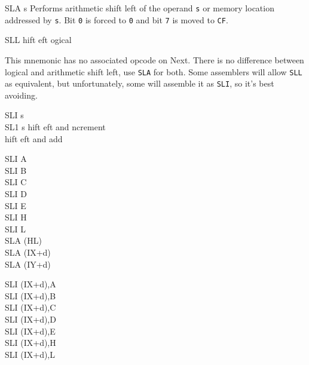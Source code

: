 \begin{basedescript}{
	\desclabelstyle{\multilinelabel}
	\desclabelwidth{3cm}}
\begin{DetailItem}{SLA s}
		Performs arithmetic shift left of the operand {\tt s} or memory location addressed by {\tt s}. Bit {\tt 0} is forced to {\tt 0} and bit {\tt 7} is moved to {\tt CF}.

		\begin{DetailEffects}[p]
			\FlagsSLAr
		\end{DetailEffects}
						
		\begin{DetailTiming}
		\end{DetailTiming}

	\end{DetailItem}

	\begin{DetailItem}{SLL}
		{hift \IH{L}eft ogical}
		{}

		This mnemonic has no associated opcode on Next. There is no difference between logical and arithmetic shift left, use {\tt SLA} for both. Some assemblers will allow {\tt SLL} as equivalent, but unfortunately, some will assemble it as {\tt SLI}, so it's best avoiding.
		
	\end{DetailItem}

	\pagebreak
	\begin{DetailItem}{SLI s\UNDOC\\SL1 s\UNDOC}
		{hift eft and ncrement\\
		hift eft and add }
		{}
		
		\begin{DetailVariants}
			SLI A\\
			SLI B\\
			SLI C\\
			SLI D\\
			SLI E\\
			SLI H\\
			SLI L\\
			SLA (HL)\\
			SLA (IX+d)\\
			SLA (IY+d)

			\columnbreak
			SLI (IX+d),A\UNDOC\\
			SLI (IX+d),B\UNDOC\\
			SLI (IX+d),C\UNDOC\\
			SLI (IX+d),D\UNDOC\\
			SLI (IX+d),E\UNDOC\\
			SLI (IX+d),H\UNDOC\\
			SLI (IX+d),L\UNDOC


\end{DetailVariants}
\end{DetailItem}
\end{basedescript}
